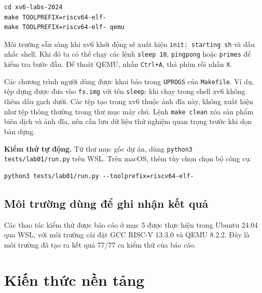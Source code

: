 \documentclass[12pt,a4paper]{article}
\begin{document}
\begin{terminalbox}[title={macOS}]
\small
\begin{verbatim}
cd xv6-labs-2024
make TOOLPREFIX=riscv64-elf-
make TOOLPREFIX=riscv64-elf- qemu
\end{verbatim}
\end{terminalbox}

Môi trường sẵn sàng khi xv6 khởi động sẽ xuất hiện \texttt{init: starting sh} và dấu nhắc shell. Khi đó ta có thể chạy các lệnh \texttt{sleep 10}, \texttt{pingpong} hoặc \texttt{primes} để kiểm tra bước đầu. Để thoát QEMU, nhấn \texttt{Ctrl+A}, thả phím rồi nhấn \texttt{X}.

Các chương trình người dùng được khai báo trong \texttt{UPROGS} của \texttt{Makefile}. Ví dụ, tệp dựng  được đưa vào \texttt{fs.img} với tên \texttt{sleep}; khi chạy trong shell xv6 không thêm dấu gạch dưới. Các tệp tạo trong xv6 thuộc ảnh đĩa này, không xuất hiện như tệp thông thường trong thư mục máy chủ. Lệnh \texttt{make clean} xóa sản phẩm biên dịch và ảnh đĩa, nên cần lưu dữ liệu thử nghiệm quan trọng trước khi dọn bản dựng.

\textbf{Kiểm thử tự động.} Từ thư mục gốc dự án, dùng \texttt{python3 tests/lab01/run.py} trên WSL. Trên macOS, thêm tùy chọn chọn bộ công cụ:

\begin{terminalbox}
\small
\begin{verbatim}
python3 tests/lab01/run.py --toolprefix=riscv64-elf-
\end{verbatim}
\end{terminalbox}

\subsection{Môi trường dùng để ghi nhận kết quả}

Các thao tác kiểm thử được báo cáo ở mục 5 được thực hiện trong Ubuntu 24.04 qua WSL, với môi trường cài đặt GCC RISC-V 13.3.0 và QEMU 8.2.2. Đây là môi trường đã tạo ra kết quả 77/77 ca kiểm thử của báo cáo.

\section{Kiến thức nền tảng}
\end{document}
